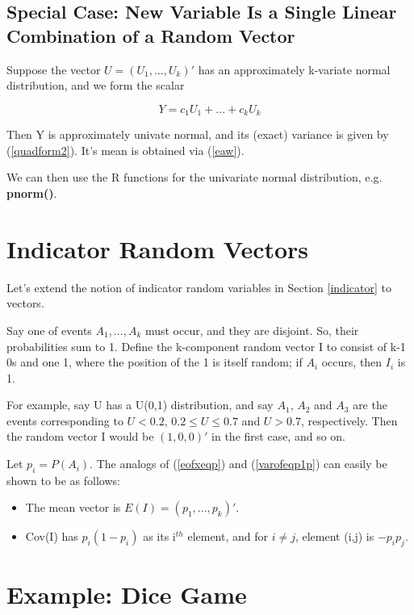 \subsection{Special Case: New Variable Is a Single Linear Combination of
a Random Vector} 
\label{singlelincomb}

Suppose the vector $U = (U_1,...,U_k)'$ has an approximately k-variate
normal distribution, and we form the scalar

\begin{equation}
Y = c_1 U_1 + ...+ c_k U_k
\end{equation}

Then Y is approximately univate normal, and its (exact) variance is
given by (\ref{quadform2}).  It's mean is obtained via (\ref{eaw}).

We can then use the R functions for the univariate normal distribution,
e.g. {\bf pnorm()}.

\section{Indicator Random Vectors}
\label{indicvecs}

Let's extend the notion of indicator random variables in Section
\ref{indicator} to vectors.

Say one of events $A_1,...,A_k$ must occur, and they are disjoint.  So,
their probabilities sum to 1.  Define the k-component random vector I to
consist of k-1 0s and one 1, where the position of the 1 is itself
random; if $A_i$ occurs, then $I_i$ is 1.

For example, say U has a U(0,1) distribution, and say $A_1$, $A_2$ and
$A_3$ are the events corresponding to $U < 0.2$, $0.2 \leq U \leq 0.7$
and $U > 0.7$, respectively.  Then the random vector I would be
$(1,0,0)'$ in the first case, and so on.  

Let $p_i = P(A_i)$.  The analogs of (\ref{eofxeqp}) and
(\ref{varofeqp1p}) can easily be shown to be as follows:

\begin{itemize}

\item The mean vector is $E(I) = (p_1,...,p_k)'$.

\item Cov(I) has $p_i(1-p_i)$ as its i$^{th}$ element, and for 
$i \neq j$, element (i,j) is $-p_i p_j$.

\end{itemize}

\section{Example:  Dice Game}
\label{dicegame}

